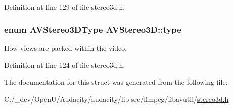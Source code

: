 Definition at line 129 of file stereo3d.\+h.

\subsubsection[{\texorpdfstring{type}{type}}]{\setlength{\rightskip}{0pt plus 5cm}enum {\bf A\+V\+Stereo3\+D\+Type} A\+V\+Stereo3\+D\+::type}\hypertarget{struct_a_v_stereo3_d_a052514d0376a94e58e3eb9db3db2a7ce}{}\label{struct_a_v_stereo3_d_a052514d0376a94e58e3eb9db3db2a7ce}
How views are packed within the video. 

Definition at line 124 of file stereo3d.\+h.



The documentation for this struct was generated from the following file\+:\begin{DoxyCompactItemize}
\item 
C\+:/\+\_\+dev/\+Open\+U/\+Audacity/audacity/lib-\/src/ffmpeg/libavutil/\hyperlink{stereo3d_8h}{stereo3d.\+h}\end{DoxyCompactItemize}

